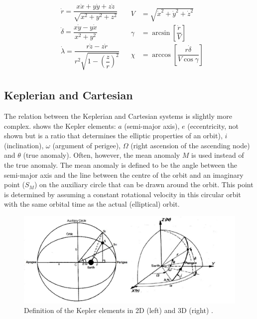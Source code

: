 \begin{align} \label{eq:carttospherv}
\begin{split}
& \dot{r}=\dfrac{x\dot{x}+y\dot{y}+z\dot{z}}{\sqrt{x^{2}+y^{2}+z^{2}}}\\
& \dot{\delta}=\dfrac{x\dot{y}-y\dot{x}}{x^{2}+y^{2}}\\
& \dot{\lambda}=\dfrac{r\dot{z}-z\dot{r}}{r^{2}\sqrt{1-\left(\dfrac{z}{r}\right)^{2}}}
\end{split}
&
\begin{split}
V&=\sqrt{\dot{x}^{2}+\dot{y}^{2}+\dot{z}^{2}}\\
\gamma&=\arcsin\left[\dfrac{\dot{r}}{V}\right]\\
\chi&=\arccos\left[\dfrac{r \dot{\delta}}{V\cos\gamma }\right]
\end{split}
\end{align}


\subsection{Keplerian and Cartesian}
\label{subsec:keplcart}
The relation between the Keplerian and Cartesian systems is slightly more complex.  shows the Kepler elements: $a$ (semi-major axis), $e$ (eccentricity, not shown but is a ratio that determines the elliptic properties of an orbit), $i$ (inclination), $\omega$ (argument of perigee), $\Omega$ (right ascension of the ascending node) and $\theta$ (true anomaly). Often, however, the mean anomaly $M$ is used instead of the true anomaly. The mean anomaly is defined to be the angle between the semi-major axis and the line between the centre of the orbit and an imaginary point ($S_{M}$) on the auxiliary circle that can be drawn around the orbit. This point is determined by assuming a constant rotational velocity in this circular orbit with the same orbital time as the actual (elliptical) orbit. 



\begin{figure}[!ht]
\centering
\includegraphics[width=1.0\textwidth]{figures/reference_frames/kepler_noomen2013basic_akcasu2013.jpg}
\caption{Definition of the Kepler elements in 2D (left) and 3D (right) \cite{noomen2013basic,akcasu2013}.}
\label{fig:kepler_noomen2013basic_akcasu2013_1}
\end{figure}

